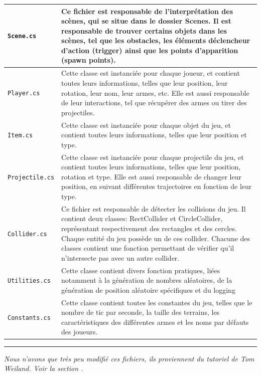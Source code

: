 \documentclass[a4paper]{article}
\begin{document}
\begin{center}
\begin{longtable}{|l|p{10cm}|}
    \hline
    \texttt{Scene.cs} & Ce fichier est responsable de l’interprétation des scènes, qui se situe dans le dossier Scenes. Il est responsable de trouver certains objets dans les scènes, tel que les obstacles, les éléments déclencheur d’action (trigger) ainsi que les points d’apparition (spawn points).\\
    \hline
    \texttt{Player.cs} & Cette classe est instanciée pour chaque joueur, et contient toutes leurs informations, telles que leur position, leur rotation, leur nom, leur armes, etc. Elle est aussi responsable de leur interactions, tel que récupérer des armes ou tirer des projectiles.\\
    \hline
    \texttt{Item.cs} & Cette classe est instanciée pour chaque objet du jeu, et contient toutes leurs informations, telles que leur position et type.\\
    \hline
    \texttt{Projectile.cs} & Cette classe est instanciée pour chaque projectile du jeu, et contient toutes leurs informations, telles que leur position, rotation et type. Elle est aussi responsable de changer leur position, en suivant différentes trajectoires en fonction de leur type.\\
    \hline
    \texttt{Collider.cs} & Ce fichier est responsable de détecter les collisions du jeu. Il contient deux classes: RectCollider et CircleCollider, représentant respectivement des rectangles et des cercles. Chaque entité du jeu possède un de ces collider. Chacune des classes contient une fonction permettant de vérifier qu’il n’intersecte pas avec un autre collider.\\
    \hline
    \texttt{Utilities.cs} & Cette classe contient divers fonction pratiques, liées notamment à la génération de nombres aléatoires, de la génération de position aléatoire spécifiques et du logging\\
    \hline
    \texttt{Constants.cs} & Cette classe contient toutes les constantes du jeu, telles que le nombre de tic par seconde, la taille des terrains, les caractéristiques des différentes armes et les noms par défauts des joueurs.\\ 
    \hline
\end{longtable}
\end{center}
\hrule
\textit{\footnotemark[1]Nous n’avons que très peu modifié ces fichiers, ils proviennent du tutoriel de Tom Weiland. Voir la section .}
\end{document}
